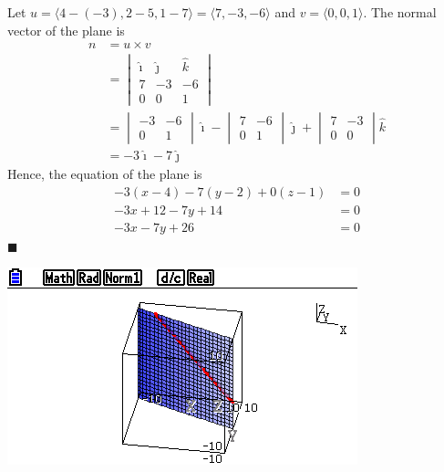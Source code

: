\begin{enumerate}
          \sol{}
          Let $u = \langle 4 - (-3), 2 - 5, 1 - 7 \rangle = \langle 7, -3, -6 \rangle$ and $v = \langle 0, 0, 1 \rangle$. The normal vector of the plane is
          \begin{align*}
              n & = u \times v                                                                   \\
                & = \begin{vmatrix}
                        \hat{\imath} & \hat{\jmath} & \hat{k} \\
                        7            & -3           & -6      \\
                        0            & 0            & 1
                    \end{vmatrix}                    \\
                & = \begin{vmatrix}
                        -3 & -6 \\
                        0  & 1
                    \end{vmatrix}\hat{\imath} - \begin{vmatrix}
                                                    7 & -6 \\
                                                    0 & 1
                                                \end{vmatrix}\hat{\jmath} + \begin{vmatrix}
                                                                                7 & -3 \\
                                                                                0 & 0
                                                                            \end{vmatrix}\hat{k} \\
                & = -3\hat{\imath} - 7\hat{\jmath}
          \end{align*}
          Hence, the equation of the plane is
          \begin{align*}
              -3(x - 4) - 7(y - 2) + 0(z - 1) & = 0 \\
              -3x + 12 - 7y + 14              & = 0 \\
              -3x - 7y + 26                   & = 0
          \end{align*} \hfill $\blacksquare$
          \begin{center}
              \includegraphics[scale=0.5]{assets/larson11.5q56graph.png}
          \end{center}
\end{enumerate}


